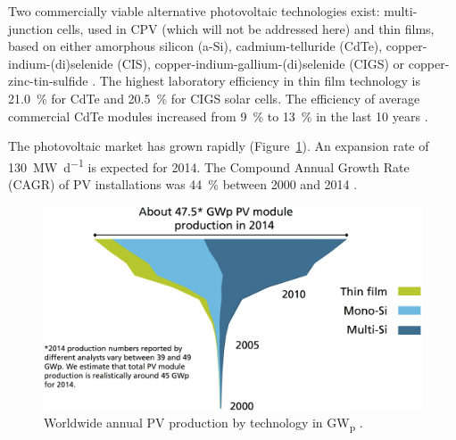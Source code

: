 Two commercially viable alternative photovoltaic technologies exist: multi-junction cells, used in CPV (which will not be addressed here) and thin films, based on either amorphous silicon (a-Si), cadmium-telluride (CdTe), copper-indium-(di)selenide (CIS), copper-indium-gallium-(di)selenide (CIGS) or copper-zinc-tin-sulfide \cite{IEA2014c}. The highest laboratory efficiency in thin film technology is \SI{21.0}{\percent} for CdTe and \SI{20.5}{\percent} for CIGS solar cells. The efficiency of average commercial CdTe modules increased from \SI{9}{\percent} to \SI{13}{\percent} in the last 10 years \cite{FraunhoferISE2015}.


The photovoltaic market has grown rapidly (Figure~\ref{PV_Prod_by_Tech}). An expansion rate of \SI{130}{\mega\watt\per\day} is expected for 2014. The Compound Annual Growth Rate (CAGR) of PV installations was \SI{44}{\percent} between 2000 and 2014 \cite{FraunhoferISE2015}. 


\begin{figure}[htbp]  
\centering
\includegraphics[width=0.7\linewidth]{FIG/PV_Prod_by_Tech}
\caption[Worldwide annual PV production by technology.]{Worldwide annual PV production by technology in \si{\giga\watt}\textsubscript{p} \cite{FraunhoferISE2015}.}\label{PV_Prod_by_Tech}
\end{figure}

